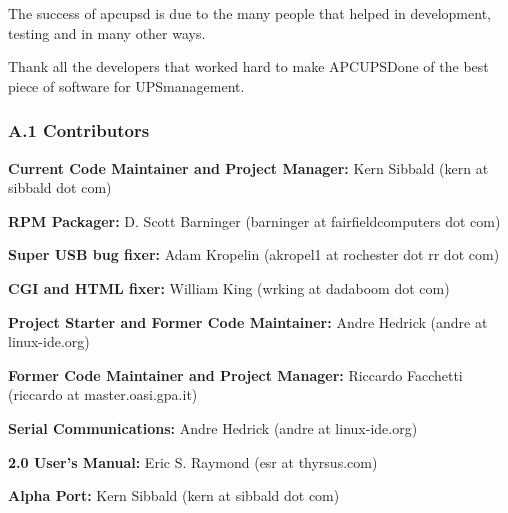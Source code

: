 {{{{{{{{{{{{{{{{{The success of apcupsd is due to the many people that helped in development,
testing and in many other ways.  

Thank all the developers that worked hard to make APCUPSDone of the best piece
of software for UPSmanagement. 

\label{Contributors}

\subsubsection*{A.1 Contributors}

\begin{description}

\item {\bf Current Code Maintainer and Project Manager:}
Kern Sibbald (kern at sibbald dot com)  

\item {\bf RPM Packager:}
D. Scott Barninger (barninger at fairfieldcomputers dot com)  

\item {\bf Super USB bug fixer:}
Adam Kropelin (akropel1 at rochester dot rr dot com)  

\item {\bf CGI and HTML fixer:}
William King (wrking at dadaboom dot com)  

\item {\bf Project Starter and Former Code Maintainer:}
Andre Hedrick (andre at linux-ide.org)  

\item {\bf Former Code Maintainer and Project Manager:}
Riccardo Facchetti (riccardo at master.oasi.gpa.it)  

\item {\bf Serial Communications:}
Andre Hedrick (andre at linux-ide.org)  

\item {\bf 2.0 User's Manual:}
Eric S. Raymond (esr at thyrsus.com)  

\item {\bf Alpha Port:}
Kern Sibbald (kern at sibbald dot com)  


\end{description}}}}}}}}}}}}}}}}}}

